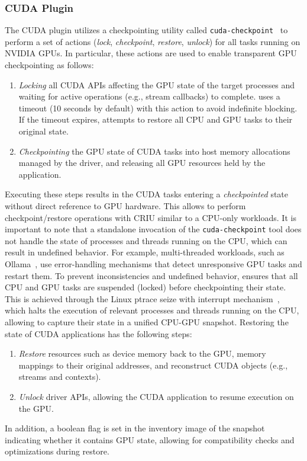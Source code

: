 \subsubsection{CUDA Plugin}\label{sec:cuda-plugin}%
The CUDA plugin utilizes a checkpointing utility called \texttt{cuda-checkpoint}~\cite{cuda-checkpoint} to perform a set of actions (\textit{lock}, \textit{checkpoint}, \textit{restore}, \textit{unlock}) for all tasks running on NVIDIA GPUs.
%
In particular, these actions are used to enable transparent GPU checkpointing as follows:
\begin{enumerate}[label=\itshape(\roman*\upshape),nosep]
    \item \textit{Locking} all CUDA APIs affecting the GPU state of the target processes and waiting for active operations (e.g., stream callbacks) to complete. \sys uses a timeout (10 seconds by default) with this action to avoid indefinite blocking. If the timeout expires, \sys attempts to restore all CPU and GPU tasks to their original state.

    \item \textit{Checkpointing} the GPU state of CUDA tasks into host memory allocations managed by the driver, and releasing all GPU resources held by the application.
\end{enumerate}
%
Executing these steps results in the CUDA tasks entering a \textit{checkpointed} state without direct reference to GPU hardware.
%
This allows to perform checkpoint/restore operations with CRIU similar to a CPU-only workloads.
%
It is important to note that a standalone invocation of the \texttt{cuda-checkpoint} tool does not handle the state of processes and threads running on the CPU, which can result in undefined behavior.
%
For example, multi-threaded workloads, such as Ollama~\cite{morgan2023ollama}, use error-handling mechanisms that detect unresponsive GPU tasks and restart them.
% 
To prevent inconsistencies and undefined behavior, \sys ensures that all CPU and GPU tasks are suspended (locked) before checkpointing their state.
% 
This is achieved through the Linux ptrace seize with interrupt mechanism~\cite{linux-ptrace}, which halts the execution of relevant processes and threads running on the CPU, allowing \sys to capture their state in a unified CPU-GPU snapshot.
%
Restoring the state of CUDA applications has the following steps:
%
\begin{enumerate}[label=\itshape(\roman*\upshape),nosep]
    \item \textit{Restore} resources such as device memory back to the GPU, memory mappings to their original addresses, and reconstruct CUDA objects (e.g., streams and contexts).
    \item \textit{Unlock} driver APIs, allowing the CUDA application to resume execution on the GPU.
\end{enumerate}
% 
In addition, a boolean flag is set in the inventory image of the snapshot indicating whether it contains GPU state, allowing for compatibility checks and optimizations during restore.

